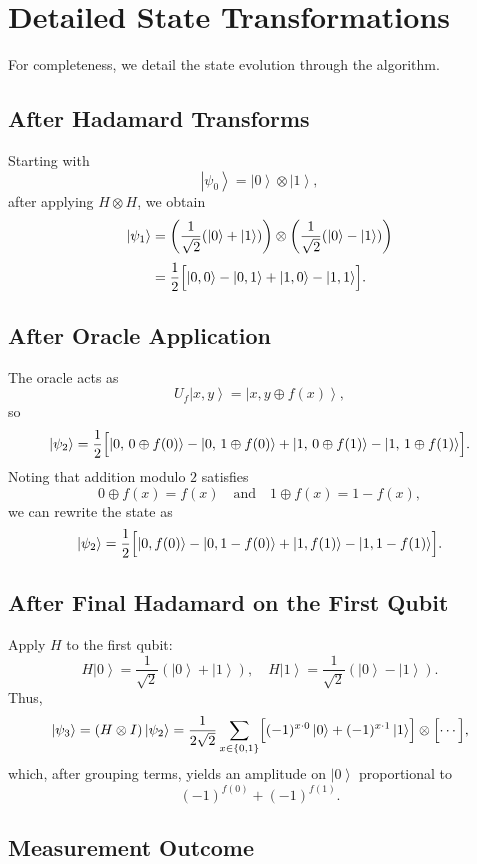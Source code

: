 \documentclass[11pt,oneside]{book}
\theoremstyle{remark}
\renewcommand{\ket}[1]{\left|#1\right\rangle}
\begin{document}
	\section{Detailed State Transformations}
	
	For completeness, we detail the state evolution through the algorithm.
	
	\subsection*{After Hadamard Transforms}
	
	Starting with
	\[
	\ket{\psi_0}=\ket{0}\otimes\ket{1},
	\]
	after applying $H\otimes H$, we obtain
	\begin{align*}
		\ket{\psi_1} &= \left(\frac{1}{\sqrt{2}}(\ket{0}+\ket{1})\right)\otimes\left(\frac{1}{\sqrt{2}}(\ket{0}-\ket{1})\right)\\[1mm]
		&=\frac{1}{2}\Bigl[\ket{0,0}-\ket{0,1}+\ket{1,0}-\ket{1,1}\Bigr].
	\end{align*}
	
	\subsection*{After Oracle Application}
	
	The oracle acts as
	\[
	U_f\ket{x,y}=\ket{x,y\oplus f(x)},
	\]
	so
	\[
	\ket{\psi_2}=\frac{1}{2}\Bigl[\ket{0,\,0\oplus f(0)}-\ket{0,\,1\oplus f(0)}+\ket{1,\,0\oplus f(1)}-\ket{1,\,1\oplus f(1)}\Bigr].
	\]
	Noting that addition modulo $2$ satisfies
	\[
	0\oplus f(x)=f(x) \quad \text{and} \quad 1\oplus f(x)=1-f(x),
	\]
	we can rewrite the state as
	\[
	\ket{\psi_2}=\frac{1}{2}\Bigl[\ket{0,f(0)}-\ket{0,1-f(0)}+\ket{1,f(1)}-\ket{1,1-f(1)}\Bigr].
	\]
	
	\subsection*{After Final Hadamard on the First Qubit}
	
	Apply $H$ to the first qubit:
	\[
	H\ket{0}=\frac{1}{\sqrt{2}}(\ket{0}+\ket{1}), \quad H\ket{1}=\frac{1}{\sqrt{2}}(\ket{0}-\ket{1}).
	\]
	Thus,
	\[
	\ket{\psi_3}=(H\otimes I)\ket{\psi_2}=\frac{1}{2\sqrt{2}}\sum_{x\in\{0,1\}}\Bigl[(-1)^{x\cdot 0}\ket{0} + (-1)^{x\cdot 1}\ket{1}\Bigr]\otimes \Bigl[ \cdots \Bigr],
	\]
	which, after grouping terms, yields an amplitude on $\ket{0}$ proportional to
	\[
	(-1)^{f(0)}+(-1)^{f(1)}.
	\]
	
	\subsection*{Measurement Outcome}
	
\end{document}
